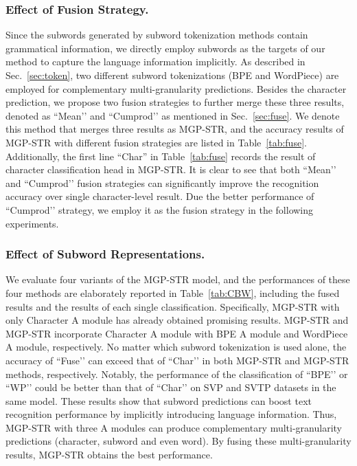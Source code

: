 \documentclass[runningheads]{llncs}
\begin{document}
\subsubsection{Effect of Fusion Strategy. }
Since the subwords generated by subword tokenization methods contain grammatical information, we directly employ subwords as the targets of our method to capture the language information implicitly. As described in Sec.~\ref{sec:token}, two different subword tokenizations (BPE and WordPiece) are employed for complementary multi-granularity predictions. 
Besides the character prediction, we propose two fusion strategies to further merge these three results, denoted as ``Mean’’ and ``Cumprod’’ as mentioned in Sec.~\ref{sec:fuse}. We denote this method that merges three results as MGP-STR, and the accuracy results of MGP-STR with different fusion strategies are listed in Table~\ref{tab:fuse}. Additionally, the first line ``Char'' in Table~\ref{tab:fuse} records the result of character classification head in MGP-STR. It is clear to see that both ``Mean’’ and ``Cumprod’’ fusion strategies can significantly improve the recognition accuracy over single character-level result. Due the better performance of ``Cumprod’’ strategy, we employ it as the fusion strategy in the following experiments.

\subsubsection{Effect of Subword Representations.}
We evaluate four variants of the MGP-STR model, and the performances of these four methods are elaborately reported in Table~\ref{tab:CBW}, including the fused results and the results of each single classification. Specifically, MGP-STR with only Character A module has already obtained promising results. MGP-STR and MGP-STR incorporate Character A module with BPE A module and WordPiece A module, respectively. No matter which subword tokenization is used alone, the accuracy of ``Fuse’’ can exceed that of ``Char’’ in both MGP-STR and MGP-STR methods, respectively. Notably, the performance of the classification  of ``BPE’’ or ``WP’’ could be better than that of ``Char’’ on SVP and SVTP datasets in the same model. These results show that subword predictions can 
boost text recognition performance by implicitly introducing language information. Thus, MGP-STR with three A modules can produce complementary multi-granularity predictions (character, subword and even word). By fusing these multi-granularity results, MGP-STR obtains the best performance. 
\end{document}

